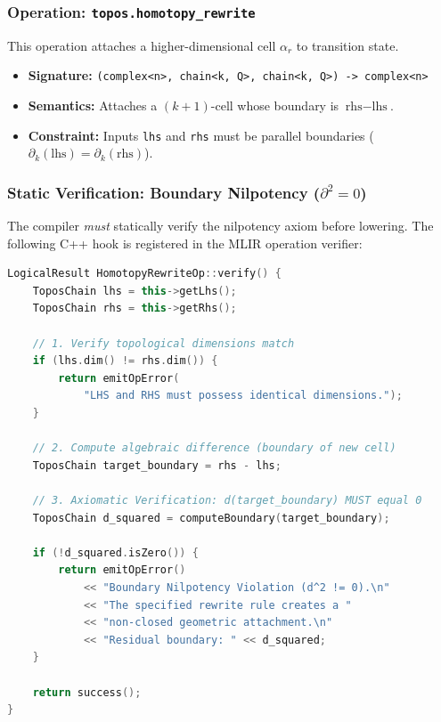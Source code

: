 \documentclass[manuscript, nonacm, review=false]{acmart}
\theoremstyle{definition}
\theoremstyle{plain}
\begin{document}
\subsubsection{Operation: \texttt{topos.homotopy\_rewrite}}

This operation attaches a higher-dimensional cell $\alpha_r$ to transition state.

\begin{itemize}
    \item \textbf{Signature:} \texttt{(complex<n>, chain<k, Q>, chain<k, Q>) -> complex<n>}
    \item \textbf{Semantics:} Attaches a $(k+1)$-cell whose boundary is $\text{rhs} - \text{lhs}$.
    \item \textbf{Constraint:} Inputs \texttt{lhs} and \texttt{rhs} must be parallel boundaries ($\partial_k(\text{lhs}) = \partial_k(\text{rhs})$).
\end{itemize}

\subsubsection{Static Verification: Boundary Nilpotency ($\partial^2 = 0$)}

The compiler \emph{must} statically verify the nilpotency axiom before lowering. The following C++ hook is registered in the MLIR operation verifier:

\begin{lstlisting}[language=C++, caption={Nilpotency verification hook for \texttt{HomotopyRewriteOp}}, label={lst:verify}]
LogicalResult HomotopyRewriteOp::verify() {
    ToposChain lhs = this->getLhs();
    ToposChain rhs = this->getRhs();
    
    // 1. Verify topological dimensions match
    if (lhs.dim() != rhs.dim()) {
        return emitOpError(
            "LHS and RHS must possess identical dimensions.");
    }
    
    // 2. Compute algebraic difference (boundary of new cell)
    ToposChain target_boundary = rhs - lhs;
    
    // 3. Axiomatic Verification: d(target_boundary) MUST equal 0
    ToposChain d_squared = computeBoundary(target_boundary);
    
    if (!d_squared.isZero()) {
        return emitOpError()
            << "Boundary Nilpotency Violation (d^2 != 0).\n"
            << "The specified rewrite rule creates a "
            << "non-closed geometric attachment.\n"
            << "Residual boundary: " << d_squared;
    }
    
    return success();
}
\end{lstlisting}
\end{document}
